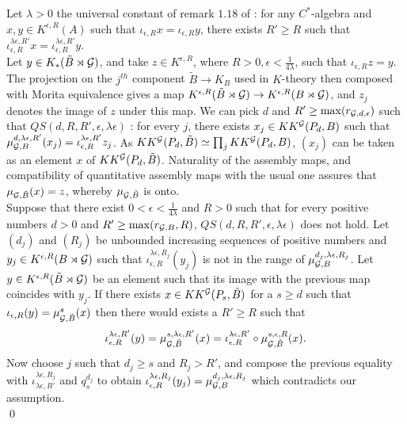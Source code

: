 \begin{dem}
Let $\lambda>0$ the universal constant of remark $1.18$ of \cite{OY2} : for any $C^*$-algebra and $x,y\in K^{\epsilon, R}(A)$ such that $\iota_{\epsilon,R} x =\iota_{\epsilon,R}y$, there exists $R'\geq R$ such that $\iota_{\epsilon,R}^{\lambda\epsilon,R'} x =\iota_{\epsilon,R}^{\lambda\epsilon,R'}y$.\\

Let $y\in K_*(\tilde B\rtimes \mathcal G)$, and take $z\in K^{\epsilon,R}$, where $R>0,\epsilon<\frac{1}{4\lambda}$, such that $\iota_{\epsilon,R}z = y$. The projection on the $j^{th}$ component $\tilde B \rightarrow K_B $ used in $K$-theory then composed with Morita equivalence gives a map $K^{\epsilon,R}(\tilde B\rtimes \mathcal G)\rightarrow K^{\epsilon ,R}(B\rtimes \mathcal G)$, and $z_j$ denotes the image of $z$ under this map. We can pick $d$ and $R'\geq\max (r_{\mathcal G,d,\epsilon})$ such that $QS(d,R,R',\epsilon,\lambda\epsilon)$ : for every $j$, there exists $x_j\in KK^\mathcal G(P_d,B) $ such that $\mu_{\mathcal G,B}^{d,\lambda\epsilon,R'}(x_j)=\iota_{\epsilon,R}^{\lambda\epsilon,R'}z_j$. As $KK^\mathcal G(P_d,\tilde B)\simeq \prod_j KK^\mathcal G(P_d,B)$, $(x_j)$ can be taken as an element $x$ of $KK^\mathcal G(P_d,\tilde B)$. Naturality of the assembly maps, and compatibility of quantitative assembly maps with the usual one assures that $\mu_{\mathcal G,\tilde B}(x)=z$, whereby $\mu_{\mathcal G,\tilde B}$ is onto.\\

Suppose that there exist $0<\epsilon<\frac{1}{4\lambda}$ and $R>0$ such that for every positive numbers $d>0$ and $R'\geq\max (r_{\mathcal G,B},R)$, $QS(d,R,R',\epsilon,\lambda\epsilon)$ does not hold. Let $(d_j)$ and $(R_j)$ be unbounded increasing sequences of positive numbers and $y_j\in K^{\epsilon,R}(B\rtimes \mathcal G)$ such that $\iota_{\epsilon,R}^{\lambda\epsilon,R_j}(y_j)$ is not in the range of $\mu_{\mathcal G,B}^{d_j,\lambda\epsilon,R_j}$. Let $y\in K^{\epsilon,R}(\tilde B\rtimes \mathcal G)$ be an element such that its image with the previous map coincides with $y_j$. If there exists $x\in KK^\mathcal G(P_{s},\tilde B)$ for a $s\geq d$ such that $\iota_{\epsilon,R}( y) =\mu_{\mathcal G,\tilde B}^s(x)$ then there would exists a $R'\geq R$ such that
\[\iota_{\epsilon,R}^{\lambda\epsilon, R'}( y) =\mu_{\mathcal G,\tilde B}^{s,\lambda\epsilon,R'}(x) = \iota_{\epsilon,R}^{\lambda\epsilon, R'}\circ\mu_{\mathcal G,\tilde B}^{s,\epsilon,R}(x).\]
Now choose $j$ such that $d_j\geq s$ and $R_j>R'$, and compose the previous equality with $\iota_{\lambda\epsilon,R'}^{\lambda\epsilon,R_j}$ and $q_s^{d_j}$ to obtain $\iota_{\epsilon,R}^{\lambda\epsilon,R_j}(y_j)=\mu_{\mathcal G,B}^{d_j,\lambda\epsilon,R_j}$ which contradicts our assumption.\\
\qed
\end{dem}

